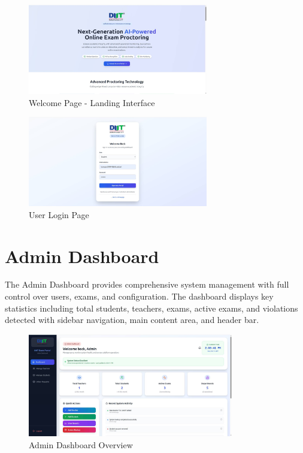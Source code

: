 \begin{figure}[p]
    \centering
    \includegraphics[width=0.7\textwidth]{Chap4/welcome_page.jpg}
    \caption{Welcome Page - Landing Interface}
    \label{fig:welcome_page}
\end{figure}

\begin{figure}[p]
    \centering
    \includegraphics[width=0.7\textwidth]{Chap4/login_page.jpg}
    \caption{User Login Page}
    \label{fig:login_page}
\end{figure}

\section{Admin Dashboard}

The Admin Dashboard provides comprehensive system management with full control over users, exams, and configuration. The dashboard displays key statistics including total students, teachers, exams, active exams, and violations detected with sidebar navigation, main content area, and header bar.

\begin{figure}[p]
    \centering
    \includegraphics[width=0.8\textwidth]{Chap4/admin_dashboard_overview.jpg}
    \caption{Admin Dashboard Overview}
    \label{fig:admin_dashboard}
\end{figure}

